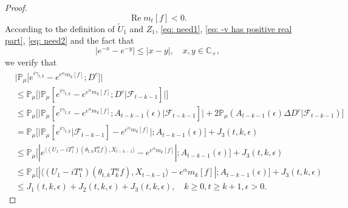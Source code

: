 \documentclass[12pt,oneside,english]{amsart}
\theoremstyle{plain}
\theoremstyle{definition}
\numberwithin{equation}{section}
\begin{document}
\begin{proof}
\begin{equation}
\label{eq: need2}
	\operatorname {Re} m_t[f] < 0.
\end{equation}
    According to the definition of $\tilde U_1$ and $Z_1$, \eqref{eq: need1}, \eqref{eq: -v has positive real part}, \eqref{eq: need2} and the fact that
\[
	|e^{-x} - e^{-y}| \leq |x-y|,\quad x,y \in \mathbb C_+,
\]
	we verify that
\begin{align}
\label{eq: inequality that will used later}
    &\big|\mathbb{P}_{\mu}\big[e^{i\gamma_{t,k}}-e^{e^{\alpha}m_k[f]}; D^c\big]\big|
    \\& \leq \mathbb{P}_{\mu}\Big[\big| \mathbb{P}_{\mu}[e^{i\gamma_{t,k}}-e^{e^{\alpha}m_k[f]}; D^c | \mathscr F_{t-k-1}]\big|\Big]
    \\& \leq \mathbb{P}_{\mu}\Big[\big| \mathbb{P}_{\mu}[e^{i\gamma_{t,k}}-e^{e^{\alpha}m_k[f]}; A_{t-k-1}(\epsilon)| \mathscr F_{t-k-1}]\big| + 2\mathbb P_\mu(A_{t-k-1}(\epsilon) \Delta D^c| \mathscr F_{t-k-1})\Big]
    \\& = \mathbb{P}_{\mu}\Big[ \big|\mathbb{P}_{\mu}[e^{i\gamma_{t,k}}| \mathscr F_{t-k-1}]-e^{e^{\alpha}m_k[f]}\big|;A_{t-k-1}(\epsilon)\Big] + J_3(t,k,\epsilon)
    \\& \leq \mathbb{P}_{\mu}\big[|e^{\langle (U_1 - iT_{1}^{\alpha}) (\theta_{t,k}T_k^{\alpha}f),X_{t-k-1}\rangle}-e^{e^{\alpha}m_k[f]}|;A_{t-k-1}(\epsilon)\big]+  J_3(t,k,\epsilon)
    \\& \leq \mathbb{P}_{\mu}\big[|\langle (U_1 - i T_1^\alpha)(\theta_{t,k}T_k^{\alpha}f),X_{t-k-1}\rangle-e^{\alpha}m_k[f]|;A_{t-k-1}(\epsilon)\big]+  J_3(t,k,\epsilon)
    \\&\leq J_1(t,k,\epsilon) + J_2(t,k,\epsilon)+J_3(t,k,\epsilon),
    \quad k\geq 0, t\geq k+1, \epsilon> 0.
\end{align}


\end{proof}
\end{document}

